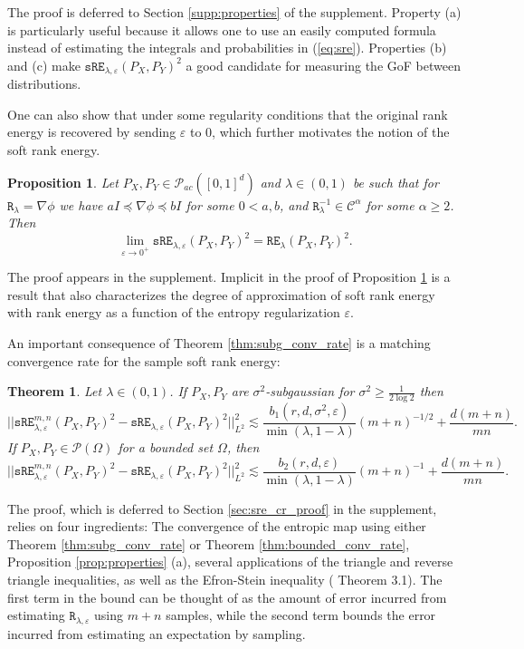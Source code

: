 \documentclass{article}
\newtheorem{proposition}{Proposition}
\newtheorem{theorem}{Theorem}
\theoremstyle{definition}
\newcommand{\sR}{\mathtt{R}_{\lambda,\varepsilon}}
\newcommand{\R}{\mathtt{R}_{\lambda}}
\newcommand{\sRE}{\mathtt{sRE}_{\lambda,\varepsilon}}
\newcommand{\sREn}{\mathtt{sRE}_{\lambda, \varepsilon}^{m,n}}
\newcommand{\RE}{\mathtt{RE}_{\lambda}}
\begin{document}
The proof is deferred to Section \ref{supp:properties} of the supplement. Property (a) is particularly useful because it allows one to use an easily computed formula instead of estimating the integrals and probabilities in (\ref{eq:sre}).
Properties (b) and (c) make $\sRE(P_X,P_Y)^2$ a good candidate for measuring the GoF between distributions.

One can also show that under some regularity conditions that the original rank energy is recovered by sending $\varepsilon$ to 0, which further motivates the notion of the soft rank energy.
\begin{proposition} \label{prop:sRE_eps_convergence} Let $ P_X,P_Y \in \mathcal{P}_{ac}([0,1]^d)$ and $\lambda \in (0,1)$ be such that for $\R = \nabla \phi$ we have $aI \preceq \nabla \phi \preceq bI$ for some $0 < a,b$, and $\R^{-1} \in \mathcal{C}^\alpha$ for some $\alpha \geq 2$. Then
\begin{equation*}
    \lim_{\varepsilon \rightarrow 0^+} \sRE(P_X,P_Y)^2 = \RE(P_X,P_Y)^2.
\end{equation*}
\end{proposition}
The proof appears in the supplement.  Implicit in the proof of Proposition \ref{prop:sRE_eps_convergence} is a result that also characterizes the degree of approximation of soft rank energy with rank energy as a function of the entropy regularization $\varepsilon$.

An important consequence of Theorem  \ref{thm:subg_conv_rate} is a matching convergence rate for the sample soft rank energy:
\begin{theorem} \label{thm:sre_convergence_rate}
    Let $\lambda \in (0,1)$. If $P_X,P_Y$ are $\sigma^2$-subgaussian for $\sigma^2 \geq \frac{1}{2\log 2}$  then 
    \begin{equation*}
        ||\sREn(P_X,P_Y)^2 - \sRE(P_X,P_Y)^2||_{L^2}^2 \lesssim  \frac{b_1(r,d,\sigma^2,\varepsilon)}{\min(\lambda, 1-\lambda)}(m+n)^{-1/2} + \frac{d(m+n)}{mn}.
    \end{equation*}
    If $P_X,P_Y \in \mathcal{P}(\Omega)$ for a bounded set $\Omega$, then
    \begin{equation*}
        ||\sREn(P_X,P_Y)^2 - \sRE(P_X,P_Y)^2||_{L^2}^2 \lesssim  \frac{b_2(r,d,\varepsilon)}{\min(\lambda, 1-\lambda)}(m+n)^{-1} + \frac{d(m+n)}{mn}.
    \end{equation*}
\end{theorem}
The proof, which is deferred to Section \ref{sec:sre_cr_proof} in the supplement, relies on four ingredients: The convergence of the entropic map using either Theorem \ref{thm:subg_conv_rate} or Theorem \ref{thm:bounded_conv_rate}, Proposition \ref{prop:properties} (a),  several applications of the triangle and reverse triangle inequalities, as well as the Efron-Stein inequality (\cite{boucheron2013concentration} Theorem 3.1). The first term in the bound can be thought of as the amount of error incurred from estimating $\sR$ using $m+n$ samples, while the second term bounds the error incurred from estimating an expectation by sampling. 
\end{document}

